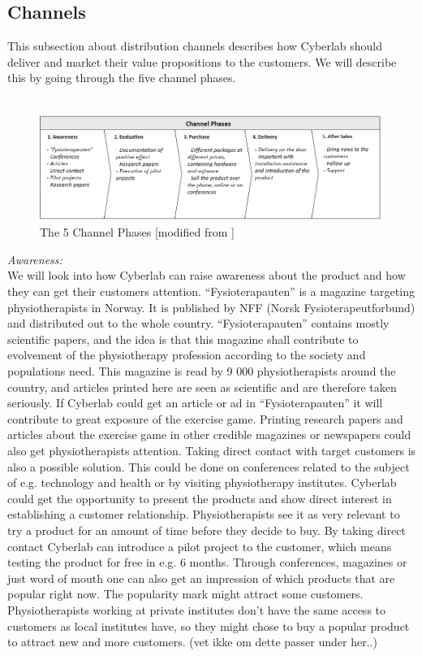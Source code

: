 \subsection{Channels}
This subsection about distribution channels describes how Cyberlab should deliver and market their value propositions to the customers. We will describe this by going through the five channel phases.\\ \\
\begin{figure}[h]
\label{fig:Channels}
\begin{center}
\includegraphics[angle=90,scale=0.7]{channels}
\caption[Channels]{The 5 Channel Phases [modified from \cite{osterwalder}\cite{osterwalderthesis}]}
\end{center}
\end{figure}
\emph{Awareness:} \\ 
We will look into how Cyberlab can raise awareness about the product and how they can get their customers attention.  “Fysioterapauten” is a magazine targeting physiotherapists in Norway. It is published by NFF (Norsk Fysioterapeutforbund) and distributed out to the whole country. “Fysioterapauten” contains mostly scientific papers, and the idea is that this magazine shall contribute to evolvement of the physiotherapy profession according to the society and populations need. This magazine is read by 9 000 physiotherapists around the country, and articles printed here are seen as scientific and are therefore taken seriously.  If Cyberlab could get an article or ad in “Fysioterapauten” it will contribute to great exposure of the exercise game.  Printing research papers and articles about the exercise game in other credible magazines or newspapers could also get physiotherapists attention.  Taking direct contact with target customers is also a possible solution. This could be done on conferences related to the subject of e.g. technology and health or by visiting physiotherapy institutes. Cyberlab could get the opportunity to present the products and show direct interest in establishing a customer relationship. Physiotherapists see it as very relevant to try a product for an amount of time before they decide to buy. By taking direct contact Cyberlab can introduce a pilot project to the customer, which means testing the product for free in e.g. 6 months. Through conferences, magazines or just word of mouth one can also get an impression of which products that are popular right now. The popularity mark might attract some customers. Physiotherapists working at private institutes don’t have the same access to customers as local institutes have, so they might chose to buy a popular product to attract new and more customers. (vet ikke om dette passer under her..)\\ \\ 
